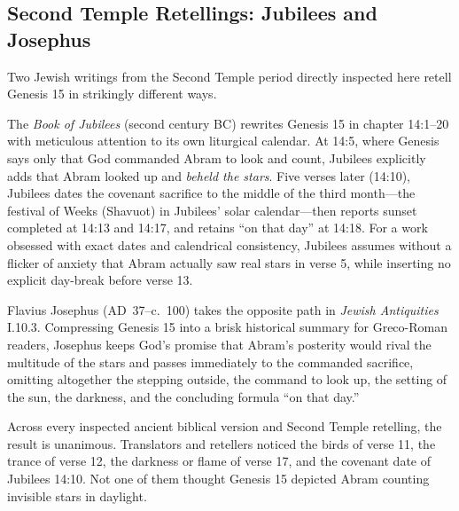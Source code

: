 \subsection{Second Temple Retellings: Jubilees and Josephus}

Two Jewish writings from the Second Temple period directly inspected here retell Genesis 15 in strikingly different ways.

The \emph{Book of Jubilees} (second century BC) rewrites Genesis 15 in chapter 14:1--20 with meticulous attention to its own liturgical calendar. At 14:5, where Genesis says only that God commanded Abram to look and count, Jubilees explicitly adds that Abram looked up and \emph{beheld the stars}. Five verses later (14:10), Jubilees dates the covenant sacrifice to the middle of the third month---the festival of Weeks (Shavuot) in Jubilees' solar calendar---then reports sunset completed at 14:13 and 14:17, and retains ``on that day'' at 14:18. For a work obsessed with exact dates and calendrical consistency, Jubilees assumes without a flicker of anxiety that Abram actually saw real stars in verse 5, while inserting no explicit day-break before verse 13.

Flavius Josephus (AD~37--c.~100) takes the opposite path in \emph{Jewish Antiquities} I.10.3. Compressing Genesis 15 into a brisk historical summary for Greco-Roman readers, Josephus keeps God's promise that Abram's posterity would rival the multitude of the stars and passes immediately to the commanded sacrifice, omitting altogether the stepping outside, the command to look up, the setting of the sun, the darkness, and the concluding formula ``on that day.''

Across every inspected ancient biblical version and Second Temple retelling, the result is unanimous. Translators and retellers noticed the birds of verse 11, the trance of verse 12, the darkness or flame of verse 17, and the covenant date of Jubilees 14:10. Not one of them thought Genesis 15 depicted Abram counting invisible stars in daylight.
